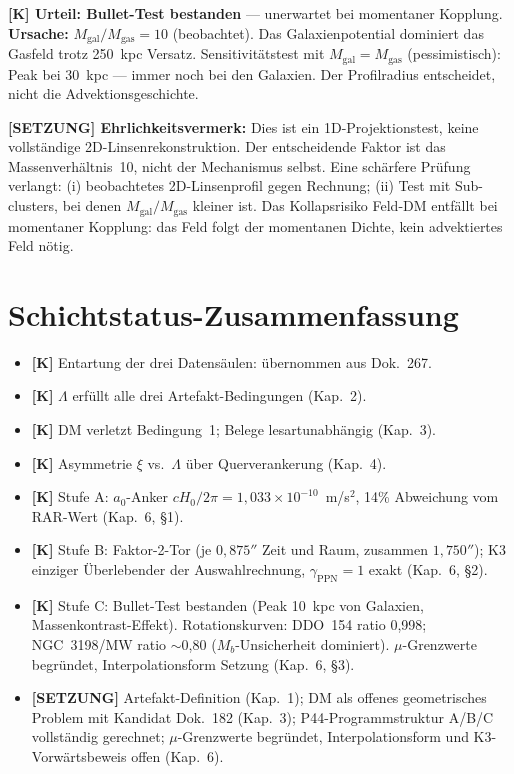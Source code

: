 \documentclass[11pt]{report}
\begin{document}
\textbf{[K] Urteil: Bullet-Test bestanden} — unerwartet bei momentaner
Kopplung. \textbf{Ursache:} $M_\text{gal}/M_\text{gas} = 10$ (beobachtet).
Das Galaxienpotential dominiert das Gasfeld trotz 250~kpc Versatz.
Sensitivitätstest mit $M_\text{gal} = M_\text{gas}$ (pessimistisch):
Peak bei 30~kpc — immer noch bei den Galaxien. Der Profil\-radius
entscheidet, nicht die Advektionsgeschichte.

\medskip
\textbf{[SETZUNG] Ehrlichkeitsvermerk:} Dies ist ein 1D-Projektionstest,
keine vollständige 2D-Linsenrekonstruktion. Der entscheidende Faktor ist
das Massenver\-hältnis~10, nicht der Mechanismus selbst. Eine schärfere
Prüfung verlangt: (i) beobachtetes 2D-Linsenprofil gegen Rechnung; (ii)
Test mit Sub-clusters, bei denen $M_\text{gal}/M_\text{gas}$ kleiner ist.
Das Kollapsrisiko Feld-DM entfällt bei momentaner Kopplung: das Feld
folgt der momentanen Dichte, kein advektiertes Feld nötig.

\chapter{Schichtstatus-Zusammenfassung}

\begin{itemize}
  \item \textbf{[K]} Entartung der drei Datensäulen: übernommen aus Dok.~267.
  \item \textbf{[K]} $\Lambda$ erfüllt alle drei Artefakt-Bedingungen (Kap.~2).
  \item \textbf{[K]} DM verletzt Bedingung~1; Belege lesartunabhängig (Kap.~3).
  \item \textbf{[K]} Asymmetrie $\xi$ vs.\ $\Lambda$ über Querverankerung (Kap.~4).
  \item \textbf{[K]} Stufe A: $a_0$-Anker $cH_0/2\pi = 1{,}033\times10^{-10}$~m/s$^2$,
        14\% Abweichung vom RAR-Wert (Kap.~6, §1).
  \item \textbf{[K]} Stufe B: Faktor-2-Tor (je $0{,}875''$ Zeit und Raum,
        zusammen $1{,}750''$); K3 einziger Überlebender der Auswahlrechnung,
        $\gamma_\text{PPN}=1$ exakt (Kap.~6, §2).
  \item \textbf{[K]} Stufe C: Bullet-Test bestanden (Peak 10~kpc von Galaxien,
        Massenkontrast-Effekt). Rotationskurven: DDO~154 ratio 0{,}998;
        NGC~3198/MW ratio $\sim$0{,}80 ($M_b$-Unsicherheit dominiert).
        $\mu$-Grenzwerte begründet, Interpolationsform Setzung (Kap.~6, §3).
  \item \textbf{[SETZUNG]} Artefakt-Definition (Kap.~1); DM als offenes
        geometrisches Problem mit Kandidat Dok.~182 (Kap.~3);
        P44-Programmstruktur A/B/C vollständig gerechnet; $\mu$-Grenzwerte
        begründet, Interpolationsform und K3-Vorwärtsbeweis offen (Kap.~6).
\end{itemize}
\end{document}
